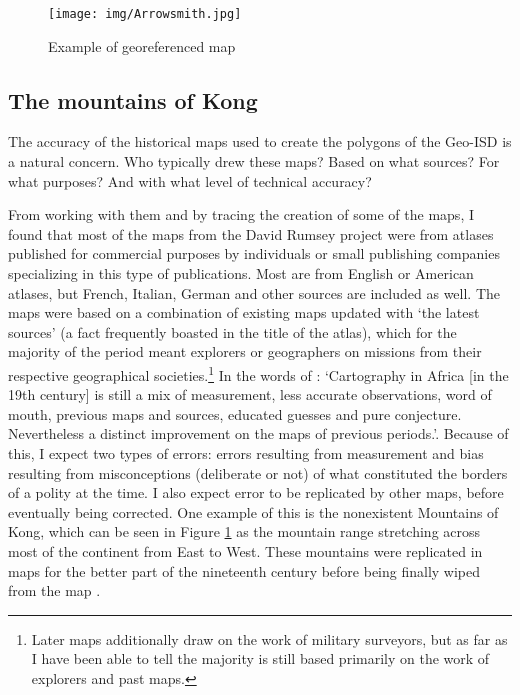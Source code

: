 \documentclass[12pt]{article}
\begin{document}

\begin{figure}[h!tpb]
	\centering
	\texttt{[image: img/Arrowsmith.jpg]}
	\caption{Example of georeferenced map}%
	\label{Arrowsmith}
\end{figure}


\subsection{The mountains of Kong}

The accuracy of the historical maps used to create the polygons of the Geo-ISD
is a natural concern. Who typically drew these maps? Based on what sources? For
what purposes? And with what level of technical accuracy? 

From working with them and by tracing the creation of some of the maps, I found
that most of the maps from the David Rumsey project were from atlases published
for commercial purposes by individuals or small publishing companies
specializing in this type of publications. Most are from English or American
atlases, but French, Italian, German and other sources are included as well. The
maps were based on a combination of existing maps updated with `the latest
sources' (a fact frequently boasted in the title of the atlas), which for the
majority of the period meant explorers or geographers on missions from their
respective geographical societies.\footnote{Later maps additionally draw on the
	work of military surveyors, but as far as I have been able to tell the
majority is still based primarily on the work of explorers and past maps.} In
the words of \citet[47-48]{Stone1995}: `Cartography in Africa [in the 19th
century] is still a mix of measurement, less accurate observations, word of
mouth, previous maps and sources, educated guesses and pure conjecture.
Nevertheless a distinct improvement on the maps of previous periods.'. Because
of this, I expect two types of errors: errors resulting from measurement and
bias resulting from misconceptions (deliberate or not) of what constituted the
borders of a polity at the time. I also expect error to be replicated by other
maps, before eventually being corrected. One example of this is the nonexistent
Mountains of Kong, which can be seen in Figure \ref{Arrowsmith} as the mountain
range stretching across most of the continent from East to West. These mountains
were replicated in maps for the better part of the nineteenth century before
being finally wiped from the map \citep{Bassett_1991}.
\end{document}
